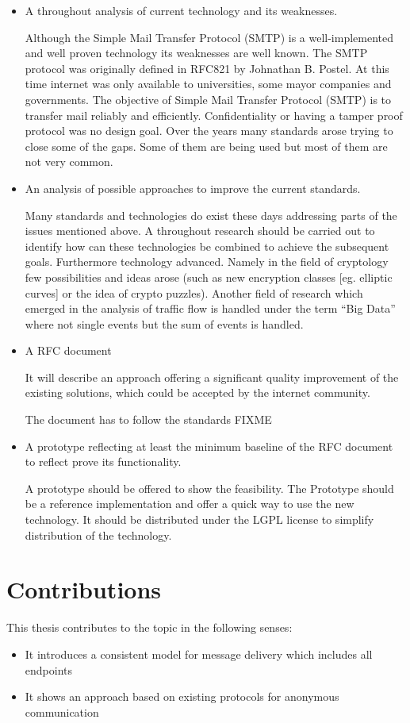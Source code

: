 \begin{itemize}
  \item A throughout analysis of current technology and its weaknesses.\par
	      Although the Simple Mail Transfer Protocol (SMTP) is a well-implement\-ed and well proven technology its weaknesses are well known. The SMTP protocol was originally defined in RFC821\cite{RFC821} by Johnathan B. Postel. At this time internet was only available to universities, some mayor companies and governments. The objective of Simple Mail Transfer Protocol (SMTP) is to transfer mail reliably and efficiently\cite[p.~1]{RFC821}. Confidentiality or having a tamper proof protocol was no design goal. Over the years many standards arose trying to close some of the gaps. Some of them are being used but most of them are not very common. 
	\item An analysis of possible approaches to improve the current standards.\par
	      Many standards and technologies do exist these days addressing parts of the issues mentioned above. A throughout research should be carried out to identify how can these technologies be combined to achieve the subsequent goals. Furthermore technology advanced. Namely in the field of cryptology few possibilities and ideas arose (such as new encryption classes [eg. elliptic curves] or the idea of crypto puzzles). Another field of research which emerged in the analysis of traffic flow is handled under the term ``Big Data'' where not single events but the sum of events is handled.
	\item A RFC document\par
	      It will describe an approach offering a significant quality improvement of the existing solutions, which could be accepted by the internet community.\par
	      The document has to follow the standards FIXME
	\item A prototype reflecting at least the minimum baseline of the RFC document to reflect prove its functionality.\par
	      A prototype should be offered to show the feasibility. The Prototype should be a reference implementation and offer a quick way to use the new technology. It should be distributed under the LGPL license to simplify distribution of the technology. 
\end{itemize}

\section{Contributions}
This thesis contributes to the topic in the following senses:
\begin{itemize}
\item It introduces a consistent model for message delivery which includes all endpoints
\item It shows an approach based on existing protocols for anonymous communication
\end{itemize}

